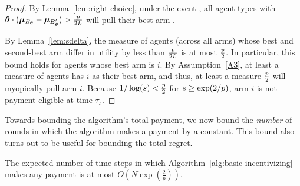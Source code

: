 \begin{proof}
By Lemma~\ref{lem:right-choice},
under the event ,
all agent types \AgV with
$\bm{\theta} \cdot (\bm{\mu}_{B_{\bm{\theta}}} - \bm{\mu}_{B'_{\bm{\theta}}})
> \frac{p}{2L}$
will pull their best arm \Best{\AgV}.

By Lemma~\ref{lem:sdelta}, the measure of agents (across all arms)
whose best and second-best arm differ in utility by less
than $\frac{p}{2L}$ is at most $\frac{p}{2}$.
In particular, this bound holds for agents whose best arm is $i$.
By Assumption~\ref{A3}, at least a measure \MinProb of agents has $i$
as their best arm, and thus, at least a measure $\frac{p}{2}$
will myopically pull arm $i$.
Because $1/\log(s) < \frac{p}{2}$ for
$s \geq \exp(2/p)$, arm $i$ is not payment-eligible at time
$\tau_s$.
\end{proof}

Towards bounding the algorithm's total payment, we now bound the
\emph{number} of rounds in which the algorithm makes a payment by a
constant.
This bound also turns out to be useful for bounding the total regret.

\begin{lemma} \label{lem:numP}
The expected number of time steps in which
Algorithm~\ref{alg:basic-incentivizing}
makes any payment is at most $O\left( N\exp\left(\frac{2}{p}\right) \right)$.
\end{lemma}


